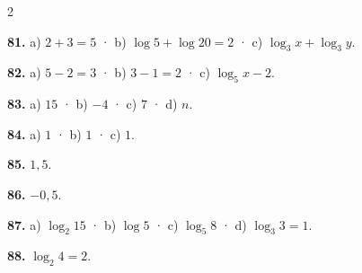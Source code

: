 \documentclass[13pt,a4paper]{extarticle}
\begin{document}
\begin{multicols}{2}
\begin{minipage}{\linewidth}
\textbf{81.} a) $2+3=5$ · b) $\log5+\log20=2$ · c) $\log_3x+\log_3y$.\par
\end{minipage}\par\vspace{1.6mm}
\par\noindent\begin{minipage}{\linewidth}
\textbf{82.} a) $5-2=3$ · b) $3-1=2$ · c) $\log_5x-2$.\par
\end{minipage}\par\vspace{1.6mm}
\par\noindent\begin{minipage}{\linewidth}
\textbf{83.} a) $15$ · b) $-4$ · c) $7$ · d) $n$.\par
\end{minipage}\par\vspace{1.6mm}
\par\noindent\begin{minipage}{\linewidth}
\textbf{84.} a) $1$ · b) $1$ · c) $1$.\par
\end{minipage}\par\vspace{1.6mm}
\par\noindent\begin{minipage}{\linewidth}
\textbf{85.} $1{,}5$.\par
\end{minipage}\par\vspace{1.6mm}
\par\noindent\begin{minipage}{\linewidth}
\textbf{86.} $-0{,}5$.\par
\end{minipage}\par\vspace{1.6mm}
\par\noindent\begin{minipage}{\linewidth}
\textbf{87.} a) $\log_2 15$ · b) $\log 5$ · c) $\log_5 8$ · d) $\log_3 3=1$.\par
\end{minipage}\par\vspace{1.6mm}
\par\noindent\begin{minipage}{\linewidth}
\textbf{88.} $\log_2 4=2$.\par

\end{minipage}
\end{multicols}
\end{document}
